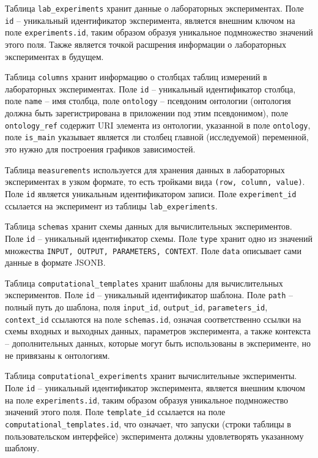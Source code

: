 Таблица \texttt{lab\_experiments} хранит данные о лабораторных экспериментах. Поле \texttt{id} -- уникальный идентификатор эксперимента, является внешним ключом на поле \texttt{experiments.id}, таким образом образуя уникальное подмножество значений этого поля. Также является точкой расшрения информации о лабораторных экспериментах в будущем.

Таблица \texttt{columns} хранит информацию о столбцах таблиц измерений в лабораторных экспериментах. Поле \texttt{id} -- уникальный идентификатор столбца, поле \texttt{name} -- имя столбца, поле \texttt{ontology} -- псевдоним онтологии (онтология должна быть зарегистрирована в приложении под этим псевдонимом), поле \texttt{ontology\_ref} содержит URI элемента из онтологии, указанной в поле \texttt{ontology}, поле \texttt{is\_main} указывает является ли столбец главной (исследуемой) переменной, это нужно для построения графиков зависимостей.

Таблица \texttt{measurements} используется для хранения данных в лабораторных экспериментах в узком формате, то есть тройками вида \texttt{(row, column, value)}. Поле \texttt{id} является уникальным идентификатором записи. Поле \texttt{experiment\_id} ссылается на эксперимент из таблицы \texttt{lab\_experiments}.

Таблица \texttt{schemas} хранит схемы данных для вычислительных экспериментов. Поле \texttt{id} -- уникальный идентификатор схемы. Поле \texttt{type} хранит одно из значений множества \texttt{{INPUT, OUTPUT, PARAMETERS, CONTEXT}}. Поле \texttt{data} описывает сами данные в формате JSONB.

Таблица \texttt{computational\_templates} хранит шаблоны для вычислительных экспериментов. Поле \texttt{id} -- уникальный идентификатор шаблона. Поле \texttt{path} -- полный путь до шаблона, поля \texttt{input\_id}, \texttt{output\_id}, \texttt{parameters\_id}, \texttt{context\_id} ссылаются на поле \texttt{schemas.id}, означая соответственно ссылки на схемы входных и выходных данных, параметров эксперимента, а также контекста -- дополнительных данных, которые могут быть использованы в эксперименте, но не привязаны к онтологиям.

Таблица \texttt{computational\_experiments} хранит вычислительные эксперименты. Поле \texttt{id} -- уникальный идентификатор эксперимента, является внешним ключом на поле \texttt{experiments.id}, таким образом образуя уникальное подмножество значений этого поля. Поле \texttt{template\_id} ссылается на поле \texttt{computational\_templates.id}, что означает, что запуски (строки таблицы в пользовательском интерфейсе) эксперимента должны удовлетворять указанному шаблону.

